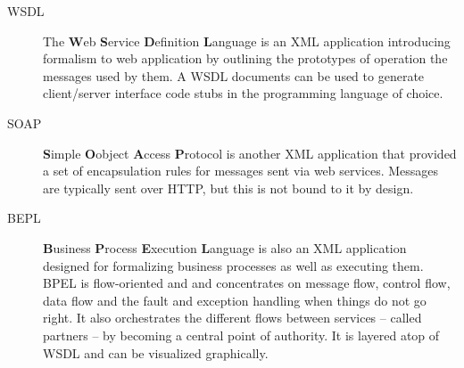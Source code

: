 \begin{description}
\item[WSDL] The \textbf{W}eb \textbf{S}ervice \textbf{D}efinition \textbf{L}anguage is an XML application introducing formalism to web application by outlining the prototypes of operation the messages used by them. A WSDL documents can be used to generate client/server interface code stubs in the programming language of choice. 

\item[SOAP] \textbf{S}imple \textbf{O}object \textbf{A}ccess \textbf{P}rotocol is another XML application that provided a  set of encapsulation rules for messages sent via web services. Messages are typically sent over HTTP, but this is not bound to it by design.

\item[BEPL] \textbf{B}usiness \textbf{P}rocess \textbf{E}xecution \textbf{L}anguage is also an XML application designed for formalizing business processes as well as executing them. BPEL is flow-oriented and and concentrates on message flow, control flow, data flow and the fault and exception handling when things do not go right. It also orchestrates the different flows between services -- called partners -- by becoming a central point of authority. It is layered atop of WSDL and can be visualized graphically.
\end{description}


